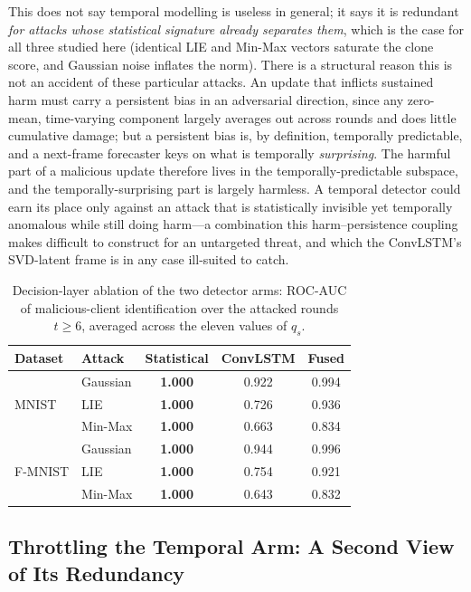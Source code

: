 \documentclass[journal]{IEEEtran}
\begin{document}
This does not say temporal modelling is useless in general; it says it is redundant \emph{for attacks whose statistical signature already separates them}, which is the case for all three studied here (identical LIE and Min-Max vectors saturate the clone score, and Gaussian noise inflates the norm). There is a structural reason this is not an accident of these particular attacks. An update that inflicts sustained harm must carry a persistent bias in an adversarial direction, since any zero-mean, time-varying component largely averages out across rounds and does little cumulative damage; but a persistent bias is, by definition, temporally predictable, and a next-frame forecaster keys on what is temporally \emph{surprising}. The harmful part of a malicious update therefore lives in the temporally-predictable subspace, and the temporally-surprising part is largely harmless. A temporal detector could earn its place only against an attack that is statistically invisible yet temporally anomalous while still doing harm---a combination this harm--persistence coupling makes difficult to construct for an untargeted threat, and which the ConvLSTM's SVD-latent frame is in any case ill-suited to catch.

\begin{table}[t]
\centering
\caption{Decision-layer ablation of the two detector arms: ROC-AUC of malicious-client identification over the attacked rounds $t \ge 6$, averaged across the eleven values of $q_s$.}
\label{tab:ablation_auc}
\setlength{\tabcolsep}{5pt}
\begin{tabular}{@{}llccc@{}}
\toprule
\textbf{Dataset} & \textbf{Attack} & \textbf{Statistical} & \textbf{ConvLSTM} & \textbf{Fused} \\
\midrule
\multirow{3}{*}{MNIST} & Gaussian & \textbf{1.000} & 0.922 & 0.994 \\
 & LIE & \textbf{1.000} & 0.726 & 0.936 \\
 & Min-Max & \textbf{1.000} & 0.663 & 0.834 \\
\midrule
\multirow{3}{*}{F-MNIST} & Gaussian & \textbf{1.000} & 0.944 & 0.996 \\
 & LIE & \textbf{1.000} & 0.754 & 0.921 \\
 & Min-Max & \textbf{1.000} & 0.643 & 0.832 \\
\bottomrule
\end{tabular}
\end{table}

\subsection{Throttling the Temporal Arm: A Second View of Its Redundancy}
\label{sec:quantile_sweep}
\end{document}
